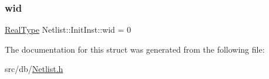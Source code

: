 \subsubsection{\texorpdfstring{wid}{wid}}
{\footnotesize\ttfamily \hyperlink{type_8h_a51898ad9e46b1265f3fab67f7d4b04a2}{Real\+Type} Netlist\+::\+Init\+Inst\+::wid = 0}



The documentation for this struct was generated from the following file\+:\begin{DoxyCompactItemize}
\item 
src/db/\hyperlink{Netlist_8h}{Netlist.\+h}\end{DoxyCompactItemize}
